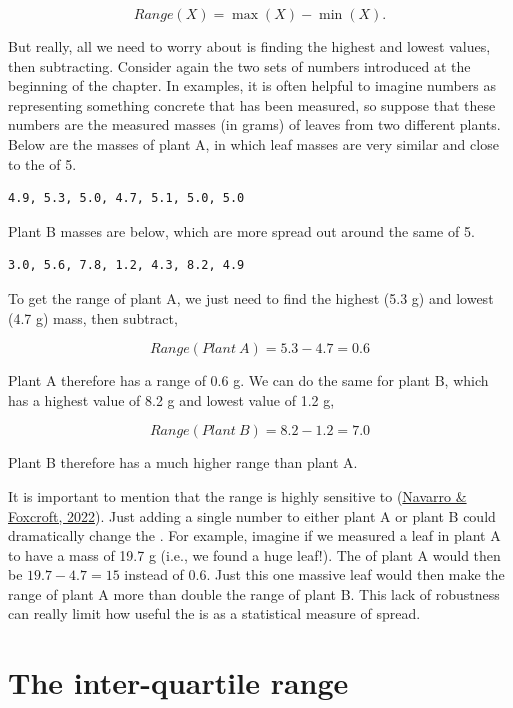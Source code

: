 \documentclass[
  openany]{krantz}
\begin{document}
\[Range(X) = \max(X) - \min(X).\]

But really, all we need to worry about is finding the highest and lowest values, then subtracting.
Consider again the two sets of numbers introduced at the beginning of the chapter.
In examples, it is often helpful to imagine numbers as representing something concrete that has been measured, so suppose that these numbers are the measured masses (in grams) of leaves from two different plants.
Below are the masses of plant A, in which leaf masses are very similar and close to the  of 5.

\begin{verbatim}
4.9, 5.3, 5.0, 4.7, 5.1, 5.0, 5.0
\end{verbatim}

Plant B masses are below, which are more spread out around the same  of 5.

\begin{verbatim}
3.0, 5.6, 7.8, 1.2, 4.3, 8.2, 4.9
\end{verbatim}

To get the range of plant A, we just need to find the highest (5.3 g) and lowest (4.7 g) mass, then subtract,

\[Range(Plant\:A) = 5.3 - 4.7 = 0.6\]

Plant A therefore has a range of 0.6 g.
We can do the same for plant B, which has a highest value of 8.2 g and lowest value of 1.2 g,

\[Range(Plant\:B) = 8.2 - 1.2 = 7.0\]

Plant B therefore has a much higher range than plant A.

It is important to mention that the range is highly sensitive to  (\protect\hyperlink{ref-Navarro2022}{Navarro \& Foxcroft, 2022}).
Just adding a single number to either plant A or plant B could dramatically change the .
For example, imagine if we measured a leaf in plant A to have a mass of 19.7 g (i.e., we found a huge leaf!).
The  of plant A would then be \(19.7 - 4.7 = 15\) instead of 0.6.
Just this one massive leaf would then make the range of plant A more than double the range of plant B.
This lack of robustness can really limit how useful the  is as a statistical measure of spread.

\hypertarget{the-inter-quartile-range}{%
\section{The inter-quartile range}\label{the-inter-quartile-range}}
\end{document}
